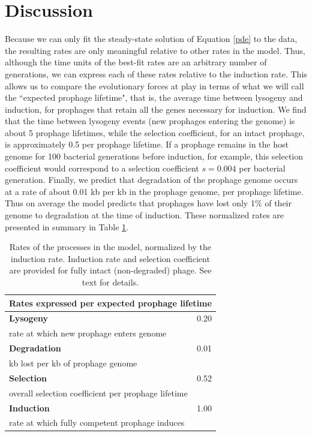 \section{Discussion}
\label{discussion}

Because we can only fit the steady-state solution of Equation \ref{pde} to the data, the resulting rates are only meaningful relative to other rates in the model.
Thus, although the time units of the best-fit rates are an arbitrary number of generations, we can express each of these rates relative to the induction rate.  This allows us to compare the evolutionary forces at play in terms of what we will call the ``expected prophage lifetime", that is, the average time between lysogeny and induction, for prophages that retain all the genes necessary for induction.  We find that the time between lysogeny events (new prophages entering the genome) is about 5 prophage lifetimes, while the selection coefficient, for an intact prophage, is approximately 0.5 per prophage lifetime.  If a prophage remains in the host genome for 100 bacterial generations before induction, for example, this selection coefficient would correspond to a selection coefficient $s=0.004$ per bacterial generation.  Finally, we predict that degradation of the prophage genome occurs at a rate of about 0.01 kb per kb in the prophage genome, per prophage lifetime.  Thus on average the model predicts that prophages have lost only 1\% of their genome to degradation at the time of induction.  These normalized rates are presented in summary in Table \ref{tab:rates}.


\begin{table}[H]
\centering
    \begin{tabular}{l r}
\hline
    \multicolumn{2}{c}{{ Rates expressed per expected prophage lifetime}}\\
    \hline
    {\bf Lysogeny} & 0.20\\
rate at which new prophage enters genome &  \\ 
{\bf Degradation}  & 0.01 \\
kb lost per kb of prophage genome &  \\
{\bf Selection} & 0.52 \\
overall selection coefficient per prophage lifetime & \\
{\bf Induction} & 1.00 \\
rate at which fully competent prophage induces & \\
\hline
    \end{tabular}
    \caption[Rates of the processes in the model, normalized by the induction rate. ]{Rates of the processes in the model, normalized by the induction rate.  Induction rate and selection coefficient are provided for fully intact (non-degraded) phage.  See text for details.}
    \label{tab:rates}
\end{table}

